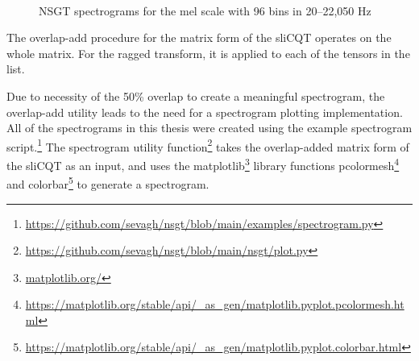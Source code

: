 \documentclass[report.tex]{subfiles}
\begin{document}
\begin{figure}[ht]
	\centering
	\\
	\caption{NSGT spectrograms for the mel scale with 96 bins in 20--22,050 Hz}
	\label{fig:overlappedspectrograms}
\end{figure}

The overlap-add procedure for the matrix form of the sliCQT operates on the whole matrix. For the ragged transform, it is applied to each of the tensors in the list.

Due to necessity of the 50\% overlap to create a meaningful spectrogram, the overlap-add utility leads to the need for a spectrogram plotting implementation. All of the spectrograms in this thesis were created using the example spectrogram script.\footnote{\url{https://github.com/sevagh/nsgt/blob/main/examples/spectrogram.py}} The spectrogram utility function\footnote{\url{https://github.com/sevagh/nsgt/blob/main/nsgt/plot.py}} takes the overlap-added matrix form of the sliCQT as an input, and uses the matplotlib\footnote{\url{matplotlib.org/}} library functions pcolormesh\footnote{\url{https://matplotlib.org/stable/api/_as_gen/matplotlib.pyplot.pcolormesh.html}} and colorbar\footnote{\url{https://matplotlib.org/stable/api/_as_gen/matplotlib.pyplot.colorbar.html}} to generate a spectrogram.
\end{document}
